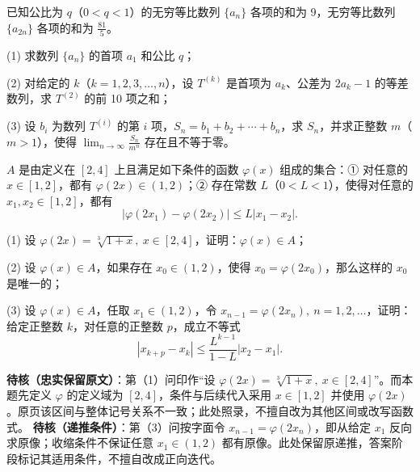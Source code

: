 \begin{question}
已知公比为 \(q\)（\(0<q<1\)）的无穷等比数列 \(\{a_n\}\) 各项的和为 9，无穷等比数列 \(\{a_{2n}\}\) 各项的和为 \(\frac{81}{5}\)。

(1) 求数列 \(\{a_n\}\) 的首项 \(a_1\) 和公比 \(q\)；

(2) 对给定的 \(k\)（\(k=1,2,3,\ldots,n\)），设 \(T^{(k)}\) 是首项为 \(a_k\)、公差为 \(2a_k-1\) 的等差数列，求 \(T^{(2)}\) 的前 10 项之和；

(3) 设 \(b_i\) 为数列 \(T^{(i)}\) 的第 \(i\) 项，\(S_n=b_1+b_2+\cdots+b_n\)，求 \(S_n\)，并求正整数 \(m\)（\(m>1\)），使得 \(\displaystyle\lim_{n\to\infty}\frac{S_n}{m^n}\) 存在且不等于零。

\end{question}
\begin{question}
\(A\) 是由定义在 \([2,4]\) 上且满足如下条件的函数 \(\varphi(x)\) 组成的集合：① 对任意的 \(x\in[1,2]\)，都有 \(\varphi(2x)\in(1,2)\)；② 存在常数 \(L\)（\(0<L<1\)），使得对任意的 \(x_1,x_2\in[1,2]\)，都有
\nopagebreak[4]
\[
|\varphi(2x_1)-\varphi(2x_2)|\leq L|x_1-x_2|.
\]

(1) 设 \(\varphi(2x)=\sqrt[3]{1+x},\ x\in[2,4]\)，证明：\(\varphi(x)\in A\)；

(2) 设 \(\varphi(x)\in A\)，如果存在 \(x_0\in(1,2)\)，使得 \(x_0=\varphi(2x_0)\)，那么这样的 \(x_0\) 是唯一的；

(3) 设 \(\varphi(x)\in A\)，任取 \(x_1\in(1,2)\)，令 \(x_{n-1}=\varphi(2x_n),\ n=1,2,\ldots\)，证明：给定正整数 \(k\)，对任意的正整数 \(p\)，成立不等式
\nopagebreak[4]
\[
|x_{k+p}-x_k|\leq\frac{L^{k-1}}{1-L}|x_2-x_1|.
\]

\begin{gktip}
\textbf{待核（忠实保留原文）}：第（1）问印作“设 \(\varphi(2x)=\sqrt[3]{1+x},\ x\in[2,4]\)”。而本题先定义 \(\varphi\) 的定义域为 \([2,4]\)，条件与后续代入采用 \(x\in[1,2]\) 并使用 \(\varphi(2x)\)。原页该区间与整体记号关系不一致；此处照录，不擅自改为其他区间或改写函数式。
\textbf{待核（递推条件）}：第（3）问按字面令 \(x_{n-1}=\varphi(2x_n)\)，即从给定 \(x_1\) 反向求原像；收缩条件不保证任意 \(x_1\in(1,2)\) 都有原像。此处保留原递推，答案阶段标记其适用条件，不擅自改成正向迭代。
\end{gktip}

\end{question}